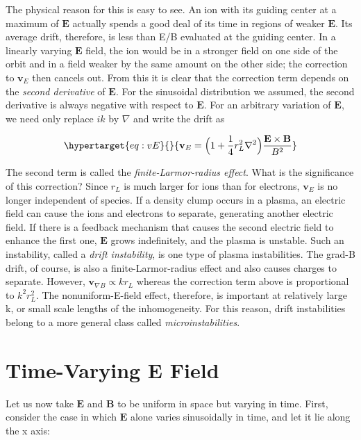 \documentclass[
  notoc %
]{tufte-book}
\begin{document}
The physical reason for this is easy to see. An ion with its guiding
center at a maximum of \(\mathbf{E}\) actually spends a good deal of its
time in regions of weaker \(\mathbf{E}\). Its average drift, therefore,
is less than E/B evaluated at the guiding center. In a linearly varying
\(\mathbf{E}\) field, the ion would be in a stronger field on one side
of the orbit and in a field weaker by the same amount on the other side;
the correction to \(\mathbf{v}_E\) then cancels out. From this it is
clear that the correction term depends on the \emph{second derivative}
of \(\mathbf{E}\). For the sinusoidal distribution we assumed, the
second derivative is always negative with respect to \(\mathbf{E}\). For
an arbitrary variation of \(\mathbf{E}\), we need only replace \(ik\) by
\(\nabla\) and write the drift as

\begin{equation}\protect\hypertarget{eq:vE}{}{
\mathbf{v}_E = \Big( 1 + \frac{1}{4}r_L^2\nabla^2 \Big) \frac{\mathbf{E}\times\mathbf{B}}{B^2}
}\label{eq:vE}\end{equation}

The second term is called the \emph{finite-Larmor-radius effect}. What
is the significance of this correction? Since \(r_L\) is much larger for
ions than for electrons, \(\mathbf{v}_E\) is no longer independent of
species. If a density clump occurs in a plasma, an electric field can
cause the ions and electrons to separate, generating another electric
field. If there is a feedback mechanism that causes the second electric
field to enhance the first one, \(\mathbf{E}\) grows indefinitely, and
the plasma is unstable. Such an instability, called a \emph{drift
instability}, is one type of plasma instabilities. The grad-B drift, of
course, is also a finite-Larmor-radius effect and also causes charges to
separate. However, \(\mathbf{v}_{\nabla B} \propto kr_L\) whereas the
correction term above is proportional to \(k^2 r_L^2\). The
nonuniform-E-field effect, therefore, is important at relatively large
k, or small scale lengths of the inhomogeneity. For this reason, drift
instabilities belong to a more general class called
\emph{microinstabilities}.

\hypertarget{sec:time-varying_E}{%
\section{Time-Varying E Field}\label{sec:time-varying_E}}

Let us now take \(\mathbf{E}\) and \(\mathbf{B}\) to be uniform in space
but varying in time. First, consider the case in which \(\mathbf{E}\)
alone varies sinusoidally in time, and let it lie along the x axis:
\end{document}
